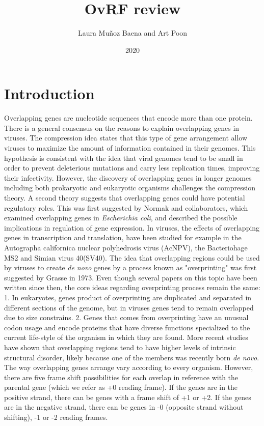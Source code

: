 \documentclass[12pt]{article}
\title{OvRF review}
\author{Laura Mu\~noz Baena and Art Poon}
\date{2020}
\begin{document}
\maketitle

\pagewiselinenumbers

\section {Introduction}
Overlapping genes are nucleotide sequences that encode more than one protein. 
There is a general consensus on the reasons to explain overlapping genes in viruses. 
The compression idea states that this type of gene arrangement allow viruses to maximize the amount of information contained in their genomes\cite{lamb1991diversity, pavesi1997informational}. 
This hypothesis is consistent with the idea that viral genomes tend to be small in order to prevent deleterious mutations and carry less replication times\cite{belshaw2008pacing}, improving their infectivity. However, the discovery of overlapping genes in longer genomes including both prokaryotic\cite{normark1983overlapping, johnson2004properties, palleja2008large} and eukaryotic organisms\cite{spencer1986overlapping, williams1986mouse, makalowska2005overlapping} challenges the compression theory.
A second theory suggests that overlapping genes could have potential regulatory roles\cite{normark1983overlapping, kapranov2007genome}.
This was first suggested by Normak and collaborators\cite{normark1983overlapping}, which examined overlapping genes in \textit{Escherichia coli}, and described the possible implications in regulation of gene expression. 
In viruses, the effects of overlapping genes in transcription and translation, have been studied for example in the Autographa californica nuclear polyhedrosis virus (AcNPV)\cite{friesen1985temporal}, the Bacteriohage MS2\cite{scherbakov2000overlapping} and Simian virus 40(SV40)\cite{buchman1984complex}.
The idea that overlapping regions could be used by viruses to create \textit{de novo} genes by a process known as "overprinting" was first suggested by Grasse\cite{grasse2013evolution} in 1973.
Even though several papers on this topic have been written since then, the core ideas regarding overprinting process remain the same: 
1. In eukaryotes, genes product of overprinting are duplicated and separated in different sections of the genome, but in viruses genes tend to remain overlapped due to size constrains. 
2. Genes that comes from overprinting have an unusual codon usage and encode proteins that have diverse functions specialized to the current life-style of the organism in which they are found. 
More recent studies have shown that overlapping regions tend to have higher levels of intrinsic structural disorder, likely because one of the members was recently born \textit{de novo}\cite{willis2018gene}.
The way overlapping genes arrange vary according to every organism. However, there are five frame shift possibilities for each overlap in reference with the parental gene (which we refer as +0 reading frame).
If the genes are in the positive strand, there can be genes with a frame shift of +1 or +2.
If the genes are in the negative strand, there can be genes in -0 (opposite strand without shifting), -1 or -2 reading frames.
\end{document}
